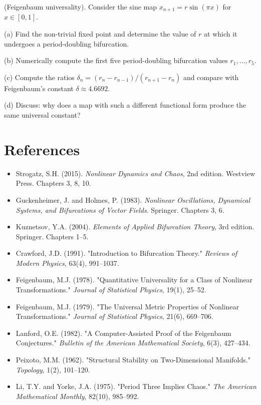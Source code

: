 \begin{exercise}
(Feigenbaum universality). Consider the sine map $x_{n+1} = r \sin(\pi x)$ for $x \in [0, 1]$.

(a) Find the non-trivial fixed point and determine the value of $r$ at which it undergoes a period-doubling bifurcation.

(b) Numerically compute the first five period-doubling bifurcation values $r_1, \ldots, r_5$.

(c) Compute the ratios $\delta_n = (r_n - r_{n-1})/(r_{n+1} - r_n)$ and compare with Feigenbaum's constant $\delta \approx 4.6692$.

(d) Discuss: why does a map with such a different functional form produce the same universal constant?


\bigskip

\end{exercise}


\section*{References}

\begin{itemize}[nosep]
  \item Strogatz, S.H. (2015). \textit{Nonlinear Dynamics and Chaos}, 2nd edition. Westview Press. Chapters 3, 8, 10.

  \item Guckenheimer, J. and Holmes, P. (1983). \textit{Nonlinear Oscillations, Dynamical Systems, and Bifurcations of Vector Fields}. Springer. Chapters 3, 6.

  \item Kuznetsov, Y.A. (2004). \textit{Elements of Applied Bifurcation Theory}, 3rd edition. Springer. Chapters 1--5.

  \item Crawford, J.D. (1991). "Introduction to Bifurcation Theory." \textit{Reviews of Modern Physics}, 63(4), 991--1037.

  \item Feigenbaum, M.J. (1978). "Quantitative Universality for a Class of Nonlinear Transformations." \textit{Journal of Statistical Physics}, 19(1), 25--52.

  \item Feigenbaum, M.J. (1979). "The Universal Metric Properties of Nonlinear Transformations." \textit{Journal of Statistical Physics}, 21(6), 669--706.

  \item Lanford, O.E. (1982). "A Computer-Assisted Proof of the Feigenbaum Conjectures." \textit{Bulletin of the American Mathematical Society}, 6(3), 427--434.

  \item Peixoto, M.M. (1962). "Structural Stability on Two-Dimensional Manifolds." \textit{Topology}, 1(2), 101--120.

  \item Li, T.Y. and Yorke, J.A. (1975). "Period Three Implies Chaos." \textit{The American Mathematical Monthly}, 82(10), 985--992.
\end{itemize}


